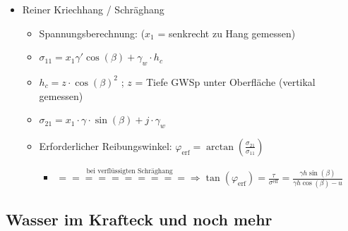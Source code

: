 \documentclass[fleqn,twoside]{article}
\begin{document}
\begin{itemize}
\item Reiner Kriechhang / Schräghang
	\begin{itemize}
		\item Spannungsberechnung: ($x_1$ = senkrecht zu Hang gemessen)
		\item $\sigma_{11} = x_1 \gamma' \cos(\beta) + \gamma_w \cdot h_c$
		\item $h_c = z \cdot \cos(\beta)^2$ ; $z$ = Tiefe GWSp unter Oberfläche (vertikal gemessen)
		\item $\sigma_{21} = x_1 \cdot \gamma \cdot \sin(\beta) + j \cdot \gamma_w$
		\item Erforderlicher Reibungswinkel: $\varphi_{\text{erf}} = \arctan(\frac{\sigma_{21}}{\sigma_{11}})$
		\begin{itemize}
		    \item $\stackrel{\text{bei verflüssigten Schräghang}}{========== \Rightarrow} \tan(\varphi_{\text{erf}}) = \frac{\tau}{\sigma^{\text{eff}}} = \frac{\gamma h \sin(\beta)}{\gamma h \cos(\beta)-u}$
		\end{itemize}
		
	\end{itemize}
	
\end{itemize}

\subsection{Wasser im Krafteck und noch mehr}
\end{document}
